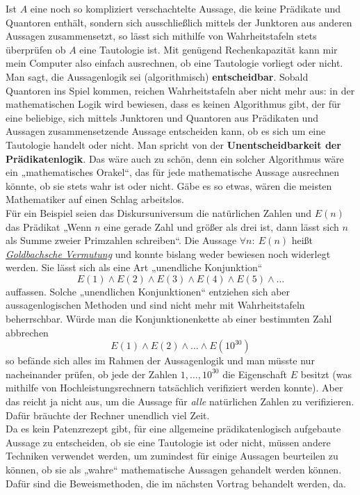  \begin{bem} \label{entscheidbar}
  Ist $A$ eine noch so kompliziert verschachtelte Aussage, die keine Prädikate und Quantoren enthält, sondern sich ausschließlich mittels der Junktoren aus anderen Aussagen zusammensetzt, so lässt sich mithilfe von Wahrheitstafeln stets überprüfen ob $A$ eine Tautologie ist. Mit genügend Rechenkapazität kann mir mein Computer also einfach ausrechnen, ob eine Tautologie vorliegt oder nicht. Man sagt, die Aussagenlogik sei (algorithmisch) \textbf{entscheidbar}. Sobald Quantoren ins Spiel kommen, reichen Wahrheitstafeln aber nicht mehr aus: in der mathematischen Logik wird bewiesen, dass es keinen Algorithmus gibt, der für eine beliebige, sich mittels Junktoren und Quantoren aus Prädikaten und Aussagen zusammensetzende Aussage entscheiden kann, ob es sich um eine Tautologie handelt oder nicht. Man spricht von der \textbf{Unentscheidbarkeit der Prädikatenlogik}. Das wäre auch zu schön, denn ein solcher Algorithmus wäre ein „mathematisches Orakel“, das für jede mathematische Aussage ausrechnen könnte, ob sie stets wahr ist oder nicht. Gäbe es so etwas, wären die meisten Mathematiker auf einen Schlag arbeitslos. \\
  Für ein Beispiel seien das Diskursuniversum die natürlichen Zahlen und $E(n)$ das Prädikat „Wenn $n$ eine gerade Zahl und größer als drei ist, dann lässt sich $n$ als Summe zweier Primzahlen schreiben“. Die Aussage $\forall n:\ E(n)$ heißt \href{https://de.wikipedia.org/wiki/Goldbachsche_Vermutung}{\emph{Goldbachsche Vermutung}} und konnte bislang weder bewiesen noch widerlegt werden. Sie lässt sich als eine Art „unendliche Konjunktion“
  \[E(1)\land  E(2)\land E(3)\land E(4)\land E(5) \land \dots \]
  auffassen. Solche „unendlichen Konjunktionen“ entziehen sich aber aussagenlogischen Methoden und sind nicht mehr mit Wahrheitstafeln beherrschbar. Würde man die Konjunktionenkette ab einer bestimmten Zahl abbrechen
  \[ E(1)\land E(2)\land\dots \land E(10^{30}) \]
  so befände sich alles im Rahmen der Aussagenlogik und man müsste nur nacheinander prüfen, ob jede der Zahlen $1,\dots , 10^{30}$ die Eigenschaft $E$ besitzt (was mithilfe von Hochleistungsrechnern tatsächlich verifiziert werden konnte). Aber das reicht ja nicht aus, um die Aussage für \emph{alle} natürlichen Zahlen zu verifizieren. Dafür bräuchte der Rechner unendlich viel Zeit. \\
  Da es kein Patenzrezept gibt, für eine allgemeine prädikatenlogisch aufgebaute Aussage zu entscheiden, ob sie eine Tautologie ist oder nicht, müssen andere Techniken verwendet werden, um zumindest für einige Aussagen beurteilen zu können, ob sie als „wahre“ mathematische Aussagen gehandelt werden können. Dafür sind die Beweismethoden, die im nächsten Vortrag behandelt werden, da.
 \end{bem}










